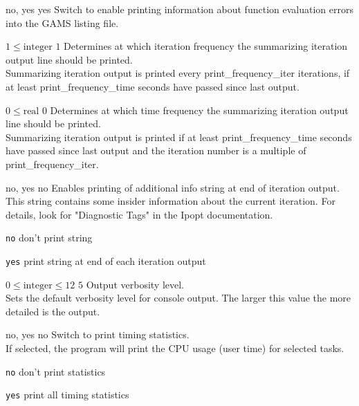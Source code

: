 %
{\ttfamily no, yes}%
{yes}%
{Switch to enable printing information about function evaluation errors into the GAMS listing file.}%
{}

%
{$1\leq\textrm{integer}$}%
{$1$}%
{Determines at which iteration frequency the summarizing iteration output line should be printed.\\
Summarizing iteration output is printed every print\_frequency\_iter iterations, if at least print\_frequency\_time seconds have passed since last output.}%
{}

%
{$0\leq\textrm{real}$}%
{$0$}%
{Determines at which time frequency the summarizing iteration output line should be printed.\\
Summarizing iteration output is printed if at least print\_frequency\_time seconds have passed since last output and the iteration number is a multiple of print\_frequency\_iter.}%
{}

%
{\ttfamily no, yes}%
{no}%
{Enables printing of additional info string at end of iteration output.\\
This string contains some insider information about the current iteration.  For details, look for "Diagnostic Tags" in the Ipopt documentation.}%
{\begin{list}{}{
\setlength{\parsep}{0em}
\setlength{\leftmargin}{5ex}
\setlength{\labelwidth}{2ex}
\setlength{\itemindent}{0ex}
\setlength{\topsep}{0pt}}
\item[\texttt{no}] don't print string
\item[\texttt{yes}] print string at end of each iteration output
\end{list}
}

%
{$0\leq\textrm{integer}\leq12$}%
{$5$}%
{Output verbosity level.\\
Sets the default verbosity level for console output. The larger this value the more detailed is the output.}%
{}

%
{\ttfamily no, yes}%
{no}%
{Switch to print timing statistics.\\
If selected, the program will print the CPU usage (user time) for selected tasks.}%
{\begin{list}{}{
\setlength{\parsep}{0em}
\setlength{\leftmargin}{5ex}
\setlength{\labelwidth}{2ex}
\setlength{\itemindent}{0ex}
\setlength{\topsep}{0pt}}
\item[\texttt{no}] don't print statistics
\item[\texttt{yes}] print all timing statistics
\end{list}
}

